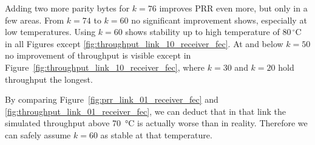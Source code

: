 Adding two more parity bytes for $k=76$ improves \ac{PRR} even more, but only in a few areas.
From $k=74$ to $k=60$ no significant improvement shows, especially at low temperatures.
Using $k=60$ shows stability up to high temperature of $80\,^{\circ}\mathrm{C}$ in all Figures except \ref{fig:throughput_link_10_receiver_fec}.
At and below $k=50$ no improvement of throughput is visible except in Figure~\ref{fig:throughput_link_10_receiver_fec}, where $k=30$ and $k=20$ hold throughput the longest.

By comparing Figure~\ref{fig:prr_link_01_receiver_fec} and \ref{fig:throughput_link_01_receiver_fec}, we can deduct that in that link the simulated throughput above \SI{70}{\celsius} is actually worse than in reality. Therefore we can safely assume $k=60$ as stable at that temperature.

